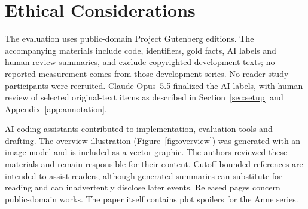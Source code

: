 \section*{Ethical Considerations}
\label{sec:ethics}

The evaluation uses public-domain Project Gutenberg editions. The accompanying materials include code,
identifiers, gold facts, AI labels and human-review summaries, and exclude copyrighted development texts; no reported
measurement comes from those development series. No reader-study participants were recruited.
Claude Opus~5.5 finalized the AI labels\ifnwhuman{}, with human review of selected original-text
items\fi{} as described in Section~\ref{sec:setup} and Appendix~\ref{app:annotation}.

AI coding assistants contributed to implementation, evaluation tools and drafting. The
overview illustration (Figure~\ref{fig:overview}) was generated with an image model and
is included as a vector graphic. The authors reviewed these materials and remain responsible
for their content. Cutoff-bounded references are intended to assist readers, although generated
summaries can substitute for reading and can inadvertently disclose later events. Released
pages concern public-domain works. The paper itself contains plot spoilers for the Anne series.
